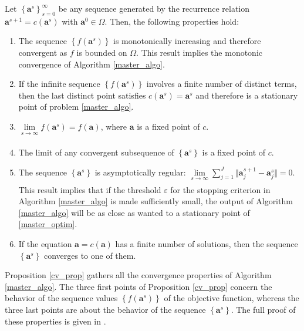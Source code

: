 \documentclass[
]{jss}
\begin{document}
\begin{proposition}
    Let $\left\lbrace  \mathbf a^s\right\rbrace_{s=0}^{\infty}$ be any sequence 
    generated by the recurrence relation $\mathbf a^{s+1} = c( \mathbf a^s)$ with 
    $\mathbf a^0\in\Omega$. Then, the following properties hold:
    \begin{enumerate}[topsep=0pt,itemsep=-0.75ex,partopsep=1ex,parsep=1ex, label = {(\alph*)}]
        \item  \label{prop_pt1} The sequence $\left\lbrace f( \mathbf a^s)\right\rbrace $ is monotonically increasing and therefore convergent as $f$ is bounded on $\Omega$. This result implies the monotonic convergence of Algorithm \ref{master_algo}.
        \item  \label{prop_pt2} If the infinite sequence $\left\lbrace f( \mathbf a^s)\right\rbrace $ involves a finite number of distinct terms, then the last distinct point satisfies $c( \mathbf a^s) =  \mathbf a^s$ and therefore is a stationary point of problem \ref{master_algo}. 
    \item  \label{prop_pt3} $\underset{s\xrightarrow[]{}\infty}\lim{f( \mathbf a^s) = f( \mathbf a)}$, where $\mathbf a$ is a fixed point of $c$.
        \item  \label{prop_pt4} The limit of any convergent subsequence of $\left\lbrace  \mathbf a^s\right\rbrace $ is a fixed point of $c$.
        \item  \label{prop_pt5} The sequence $\left\lbrace  \mathbf a^s \right\rbrace $ is asymptotically regular: $\underset{s\xrightarrow[]{}\infty}\lim{\sum_{j=1}^{J} \Vert  \mathbf a_j^{s+1} -  \mathbf a_j^s \Vert} = 0$. This result implies that if the threshold $\varepsilon$ for the stopping criterion in Algorithm \ref{master_algo} is made sufficiently small, the output of Algorithm \ref{master_algo} will be as close as wanted to a stationary point of \ref{master_optim}. 
        \item  \label{prop_pt6} If the equation $\mathbf a = c( \mathbf a)$ has a finite number of solutions, then the sequence $\left\lbrace  \mathbf a^s\right\rbrace $ converges to one of them.
    \end{enumerate}
    \label{cv_prop}
\end{proposition}

Proposition \ref{cv_prop} gathers all the convergence properties of
Algorithm \ref{master_algo}. The three first points of Proposition
\ref{cv_prop} concern the behavior of the sequence values
\(\left\lbrace f( \mathbf a^s) \right\rbrace\) of the objective
function, whereas the three last points are about the behavior of the
sequence \(\left\lbrace \mathbf a^s \right\rbrace\). The full proof of
these properties is given in \cite{Tenenhaus2017}.
\end{document}
